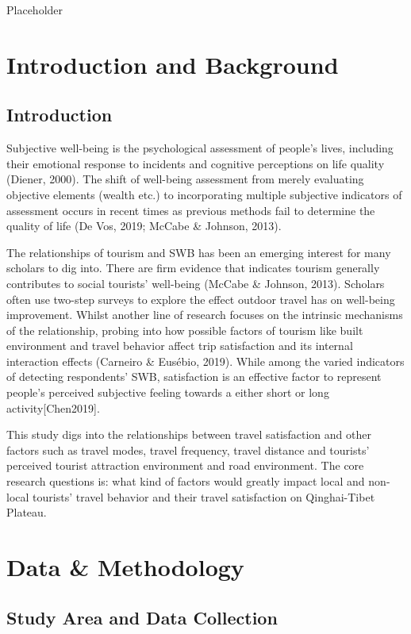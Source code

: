\documentclass[
11pt, %
oneside, %
english, %
singlespacing, %
]{macthesis} %
\begin{document}
Placeholder

\chapter{Introduction and Background}\label{rmd-basics}

\section{Introduction}\label{introduction}

Subjective well-being is the psychological assessment of people's lives, including their emotional response to incidents and cognitive perceptions on life quality (Diener, 2000). The shift of well-being assessment from merely evaluating objective elements (wealth etc.) to incorporating multiple subjective indicators of assessment occurs in recent times as previous methods fail to determine the quality of life (De Vos, 2019; McCabe \& Johnson, 2013).

The relationships of tourism and SWB has been an emerging interest for many scholars to dig into. There are firm evidence that indicates tourism generally contributes to social tourists' well-being (McCabe \& Johnson, 2013). Scholars often use two-step surveys to explore the effect outdoor travel has on well-being improvement. Whilst another line of research focuses on the intrinsic mechanisms of the relationship, probing into how possible factors of tourism like built environment and travel behavior affect trip satisfaction and its internal interaction effects (Carneiro \& Eusébio, 2019). While among the varied indicators of detecting respondents' SWB, satisfaction is an effective factor to represent people's perceived subjective feeling towards a either short or long activity{[}Chen2019{]}.

This study digs into the relationships between travel satisfaction and other factors such as travel modes, travel frequency, travel distance and tourists' perceived tourist attraction environment and road environment. The core research questions is: what kind of factors would greatly impact local and non-local tourists' travel behavior and their travel satisfaction on Qinghai-Tibet Plateau.

\chapter{Data \& Methodology}\label{rmd-basics}

\section{Study Area and Data Collection}\label{study-area-and-data-collection}
\end{document}
